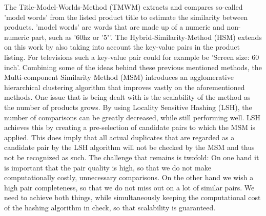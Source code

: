 The Title-Model-Worlds-Method (TMWM) extracts and compares so-called 'model words' from the listed product title to estimate the similarity between products. 'model words' are words that are made up of a numeric and non-numeric part, such as '60hz or '5"'. The Hybrid-Similarity-Method (HSM) extends on this work by also taking into account the key-value pairs in the product listing. For televisions such a key-value pair could for example be 'Screen size: 60 inch'. Combining some of the ideas behind these previous mentioned methods, the Multi-component Similarity Method (MSM) introduces an agglomerative hierarchical clustering algorithm that improves vastly on the aforementioned methods. One issue that is being dealt with is the scalability of the method as the number of products grows. By using Locality Sensitive Hashing (LSH), the number of comparisons can be greatly decreased, while still performing well. LSH achieves this by creating a pre-selection of candidate pairs to which the MSM is applied. This does imply that all actual duplicates that are regarded as a candidate pair by the LSH algorithm will not be checked by the MSM and thus not be recognized as such.
The challenge that remains is twofold:  On one hand it is important that the pair quality is high, so that we do not make computationally costly, unnecessary comparisons. On the other hand we wish a high pair completeness, so that we do not miss out on a lot of similar pairs. We need to achieve both things, while simultaneously keeping the computational cost of the hashing algorithm in check, so that scalability is guaranteed.